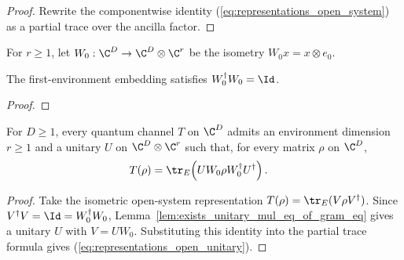 \begin{proof}\leanok
    Rewrite the componentwise identity
    (\ref{eq:representations_open_system}) as a partial trace over the
    ancilla factor.
\end{proof}

\begin{definition}
    \label{def:first_env_embedding}
    \leanok
    For $r\geq1$, let $W_0:\C^D\to\C^D\otimes\C^r$ be the isometry
    $W_0x=x\otimes e_0$.
\end{definition}

\begin{lemma}
    \label{lem:first_env_embedding_conjTranspose_mul_self}
    \leanok
    The first-environment embedding satisfies $W_0^\dagger W_0=\Id$.
\end{lemma}

\begin{proof}\leanok
\end{proof}

\begin{theorem}
    \label{thm:channel_exists_stinespring_open_system_unitary}
    \leanok
    For $D\geq1$, every quantum channel $T$ on $\C^D$ admits an
    environment dimension $r\geq1$ and a unitary
    $U$ on $\C^D\otimes\C^r$ such that, for every matrix
    $\rho$ on $\C^D$,
    \begin{align}
        T(\rho)
        &=\tr_E\!\left(UW_0\rho W_0^\dagger U^\dagger\right).
        \label{eq:representations_open_unitary}
    \end{align}
\end{theorem}

\begin{proof}\leanok
    Take the isometric open-system representation
    $T(\rho)=\tr_E(V\rho V^\dagger)$. Since
    $V^\dagger V=\Id=W_0^\dagger W_0$,
    Lemma~\ref{lem:exists_unitary_mul_eq_of_gram_eq}
    gives a unitary $U$ with $V=UW_0$. Substituting this identity into the
    partial trace formula gives (\ref{eq:representations_open_unitary}).
\end{proof}

